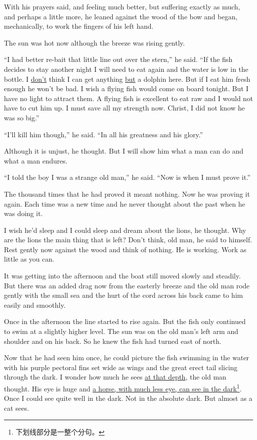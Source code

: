 With his prayers said, and feeling much better, but suffering exactly as
much, and perhaps a little more, he leaned against the wood of the bow and
began, mechanically, to work the fingers of his left hand.

The sun was hot now although the breeze was rising gently.

``I had better re-bait that little line out over the stern,'' he said. ``If
the fish decides to stay another night I will need to eat again and the
water is low in the bottle. I \uline{don't} think I can get anything
\uline{but} a dolphin here. But if I eat him fresh enough he won't be bad. I
wish a flying fish would come on board tonight. But I have no light to
\gls{attract} them. A flying fish is excellent to eat raw and I would not
have to cut him up. I must save all my strength now. Christ, I did not know
he was so big.''

``I'll kill him though,'' he said. ``In all his \gls{greatness} and his \gls{glory}.''

Although it is \gls{unjust}, he thought. But I will show him what a man can
do and what a man endures.

``I told the boy I was a strange old man,'' he said. ``Now is when I must
prove it.''

The thousand times that he had proved it meant nothing. Now he was proving
it again. Each time was a new time and he never thought about the past when
he was doing it.

I wish he'd sleep and I could sleep and dream about the lions, he thought.
Why are the lions the main thing that is left? Don't think, old man, he said
to himself. Rest gently now against the wood and think of nothing. He is
working. Work as little as you can.

It was getting into the afternoon and the boat still moved slowly and
steadily. But there was an added drag now from the easterly breeze and the
old man rode gently with the small sea and the hurt of the cord across his
back came to him easily and smoothly.

Once in the afternoon the line started to rise again. But the fish only
continued to swim at a \gls{slightly} higher level. The sun was on the old
man's left arm and shoulder and on his back. So he knew the fish had turned
east of north.

Now that he had seen him once, he could picture the fish swimming in the
water with his purple pectoral fins set wide as wings and the great
\gls{erect} tail \gls{slicing} through the dark. I wonder how much he sees
\uline{at that depth}, the old man thought. His eye is huge and \uline{a horse, with
  much less eye, can see in the dark}\footnote{下划线部分是一整个分句。}.
Once I could see quite well in the dark. Not in the \gls{absolute} dark. But
almost as a cat sees.

